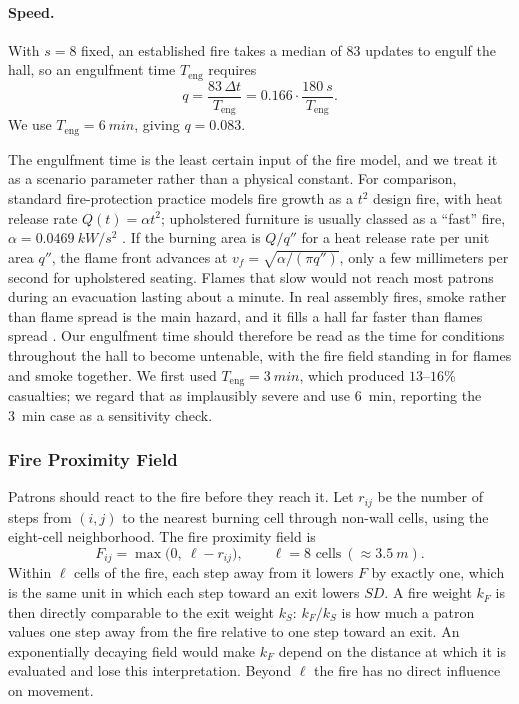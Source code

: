 \paragraph{Speed.} With $s = 8$ fixed, an established fire takes a median of $83$ updates
to engulf the hall, so an engulfment time $T_{\text{eng}}$ requires
\begin{equation}\label{eq:fire_q}
  q = \frac{83\,\Delta t}{T_{\text{eng}}} = 0.166 \cdot \frac{\SI{180}{s}}{T_{\text{eng}}}.
\end{equation}
We use $T_{\text{eng}} = \SI{6}{min}$, giving $q = 0.083$.

The engulfment time is the least certain input of the fire model, and we treat it as a
scenario parameter rather than a physical constant. For comparison, standard
fire-protection practice models fire growth as a $t^2$ design fire, with heat release
rate $Q(t) = \alpha t^2$; upholstered furniture is usually classed as a ``fast'' fire,
$\alpha = \SI{0.0469}{kW/s^2}$ \cite{sfpe}. If the burning area is $Q/q''$ for a heat
release rate per unit area $q''$, the flame front advances at
$v_f = \sqrt{\alpha/(\pi q'')}$, only a few millimeters per second for upholstered
seating. Flames that slow would not reach most patrons during an evacuation lasting about
a minute. In real assembly fires, smoke rather than flame spread is the main hazard, and
it fills a hall far faster than flames spread \cite{sfpe}. Our engulfment time should
therefore be read as the time for conditions throughout the hall to become untenable,
with the fire field standing in for flames and smoke together. We first used
$T_{\text{eng}} = \SI{3}{min}$, which produced $13$--$16\%$ casualties; we regard that as
implausibly severe and use \SI{6}{min}, reporting the \SI{3}{min} case as a sensitivity
check.

\subsubsection{Fire Proximity Field}\label{sec:fire_field}

Patrons should react to the fire before they reach it. Let $r_{ij}$ be the number of steps
from $(i, j)$ to the nearest burning cell through non-wall cells, using the eight-cell
neighborhood. The fire proximity field is
\begin{equation}\label{eq:fire_field}
  F_{ij} = \max\bigl(0,\ \ell - r_{ij}\bigr), \qquad \ell = 8 \text{ cells}
  \ (\approx \SI{3.5}{m}).
\end{equation}
Within $\ell$ cells of the fire, each step away from it lowers $F$ by exactly one, which is
the same unit in which each step toward an exit lowers $SD$. A fire weight $k_F$ is then
directly comparable to the exit weight $k_S$: $k_F / k_S$ is how much a patron values one
step away from the fire relative to one step toward an exit. An exponentially decaying
field would make $k_F$ depend on the distance at which it is evaluated and lose this
interpretation. Beyond $\ell$ the fire has no direct influence on movement.

